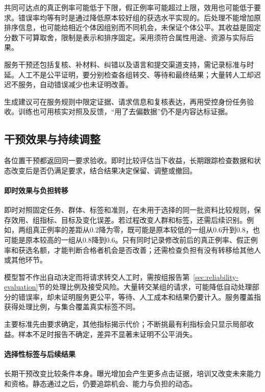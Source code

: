 共同可达点的真正例率可能低于下限，假正例率可能超过上限，效用也可能低于要求。错误率均等有时是通过降低原本较好组的获选水平实现的。后处理不能增加原排序信息，也可能给相近个体因组别而不同机会，未保证个体公平。其收益是固定分数下可算取舍，限制是表示和排序固定。采用须符合属性用途、资源与实际后果。

服务干预还包括复核、补材料、纠错以及语言和提交渠道支持，需记录标准与时延。人工不是公平证明，要分别检查各组转交、等待和最终结果；大量转人工却迟迟不服务，自动错误减少也未证明改善。

生成建议可在服务规则中限定证据、请求信息和复核表达，再用受控身份任务验收。训练也可用核实对照及反馈，“用了去偏数据”仍不是内容达标证据。

\subsection{干预效果与持续调整}
\label{sec:fairness-intervention-evaluation}
\label{sec:fairness-long-term}

各位置干预都返回同一要求验收。即时比较评估当下收益，长期跟踪检查数据和状态改变后是否仍满足要求，结合结果决定保留、调整或撤回。

\paragraph{即时效果与负担转移}

即时对照固定任务、群体、标签和准则，在未用于选择的同一批资料比较规则，保存效用、组指标、目标及变化误差。若过程改变人群和标签，还需后续识别。例如，两组真正例率的差距从0.2降为零，既可能是原本较低的一组从0.6升到0.8，也可能是原本较高的一组从0.8降到0.6。只有同时记录修改前后的真正例率、假正例率和获选名额，才能判断合格者机会是否改善；还需检查负担有没有转移给其他人或其他环节。

模型暂不作出自动决定而将请求转交人工时，需按组报告第~\ref{sec:reliability-evaluation}节的处理比例及接受风险。大量转交某组的请求，可能降低自动处理部分的错误率，却未证明服务更公平，等待、人工成本和结果仍要计入。服务覆盖指获得处理比例，与集合覆盖真实标签不同。

主要标准先由要求确定，其他指标揭示代价；不断挑最有利指标会只显示局部收益。样本不足时报告不确定，差异不显著未证明不公平消失。

\paragraph{选择性标签与后续结果}

长期干预改变比较条件本身。曝光增加会产生更多点击证据，培训又改变未来能力和资格。静态通过之后，仍要追踪机会、能力与负担的动态。

